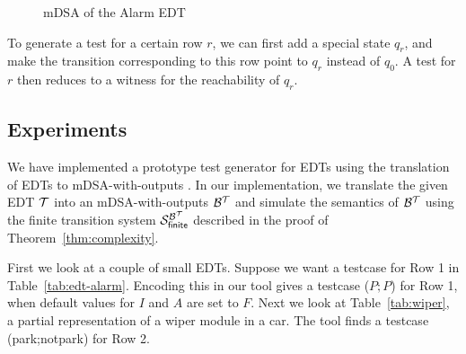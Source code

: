 \begin{figure}
    \centering
{}
\caption{mDSA of the Alarm EDT}
    \label{fig:state-diagram}
\end{figure}

To generate a test for a certain row $r$, we can first add a special state $q_r$, and make the transition corresponding to this row point to $q_r$ instead of $q_0$. A test  for $r$ then reduces to a witness for the reachability of $q_r$. 





\subsection{Experiments}
\label{sec:experiments}
We have implemented a prototype test generator for EDTs using the translation of EDTs to mDSA-with-outputs \cite{mDSAcode}. In our implementation, we translate the given EDT $\mathcal{T}$ into an mDSA-with-outputs $\mathcal{B}^{\mathcal{T}}$ and simulate the semantics of $\mathcal{B}^{\mathcal{T}}$ using the finite transition system $\mathcal{S}_{\mathsf{finite}}^{\mathcal{B}^{\mathcal{T}}}$ described in the proof of Theorem~\ref{thm:complexity}.

First we look at a couple of small EDTs. Suppose we want a testcase for Row 1 in Table~\ref{tab:edt-alarm}. Encoding this in our tool gives a testcase ($P; P$) for Row 1, when default values for $I$ and $A$ are set to $F$.
Next we look at Table~\ref{tab:wiper}, a partial representation of a wiper module in a car. The tool finds a testcase (park;notpark) for Row 2.

